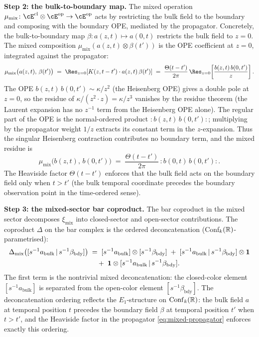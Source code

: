 \begin{example}
\smallskip\noindent
\textbf{Step 2: the bulk-to-boundary map.}
The mixed operation
$\mu_{\mathrm{mix}} \colon
\cE^{\mathrm{cl}} \otimes \cE^{\mathrm{op}}
\to \cE^{\mathrm{op}}$
acts by restricting the bulk field to the boundary and composing
with the boundary OPE, mediated by the propagator.
Concretely, the bulk-to-boundary map $\beta \colon
a(z,t) \mapsto a(0,t)$ restricts the bulk field to $z = 0$.
The mixed composition $\mu_{\mathrm{mix}}(a(z,t) \otimes
\beta(t'))$ is the OPE coefficient at $z = 0$, integrated
against the propagator:
\begin{equation}\label{eq:mu-mix}
\mu_{\mathrm{mix}}\bigl(a(z,t),\, \beta(t')\bigr)
\;=\;
\Res_{z=0}\!\left[
 K(z,t-t') \cdot a(z,t)\, \beta(t')
\right]
\;=\;
\frac{\Theta(t-t')}{2\pi}\,
\Res_{z=0}\!\left[
 \frac{b(z,t)\, b(0,t')}{z}
\right].
\end{equation}
The OPE $b(z,t)\, b(0,t') \sim \kappa/z^2$ (the Heisenberg
OPE) gives a double pole at $z = 0$, so the residue of
$\kappa/(z^2 \cdot z) = \kappa/z^3$ vanishes by the
residue theorem (the Laurent expansion has no $z^{-1}$
term from the Heisenberg OPE alone). The regular part of the
OPE is the normal-ordered product
$:b(z,t)\,b(0,t'):$; multiplying by the propagator weight
$1/z$ extracts its constant term in the $z$-expansion. Thus
the singular Heisenberg contraction contributes no boundary
term, and the mixed residue is
\begin{equation}\label{eq:mu-mix-explicit}
\mu_{\mathrm{mix}}\bigl(b(z,t),\, b(0,t')\bigr)
\;=\;
\frac{\Theta(t-t')}{2\pi}\,
{:}b(0,t)\,b(0,t'){:}.
\end{equation}
The Heaviside factor $\Theta(t-t')$ enforces
that the bulk field acts on the boundary field only when $t > t'$
(the bulk temporal coordinate precedes the boundary observation
point in the time-ordered sense).

\smallskip\noindent
\textbf{Step 3: the mixed-sector bar coproduct.}
The bar coproduct in the mixed sector decomposes
$\xi_{\mathrm{mix}}$ into closed-sector and open-sector
contributions. The coproduct $\Delta$ on the bar complex is
the ordered deconcatenation (Conf$_k(\mathbb{R})$-parametrised):
\begin{align}\label{eq:delta-mix}
\Delta_{\mathrm{mix}}\bigl(
 [s^{-1}a_{\mathrm{bulk}} \,|\,
 s^{-1}\beta_{\mathrm{bdy}}]\bigr)
&\;=\;
[s^{-1}a_{\mathrm{bulk}}]
\otimes
[s^{-1}\beta_{\mathrm{bdy}}]
\;+\;
[s^{-1}a_{\mathrm{bulk}} \,|\,
 s^{-1}\beta_{\mathrm{bdy}}]
\otimes \mathbf{1}
\notag\\
&\quad\;+\;
\mathbf{1} \otimes
[s^{-1}a_{\mathrm{bulk}} \,|\,
 s^{-1}\beta_{\mathrm{bdy}}].
\end{align}
The first term is the nontrivial mixed deconcatenation: the
closed-color element $[s^{-1}a_{\mathrm{bulk}}]$ is separated
from the open-color element $[s^{-1}\beta_{\mathrm{bdy}}]$.
The deconcatenation ordering reflects the $E_1$-structure on
$\operatorname{Conf}_k(\mathbb{R})$: the bulk field $a$ at temporal position $t$
precedes the boundary field $\beta$ at temporal position $t'$
when $t > t'$, and the Heaviside factor in the propagator
\eqref{eq:mixed-propagator} enforces exactly this ordering.


\end{example}
